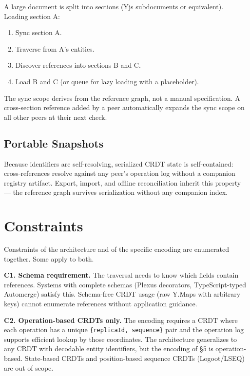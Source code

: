 A large document is split into sections (Yjs subdocuments or equivalent). Loading section A:

\begin{enumerate}
    \item Sync section A.
    \item Traverse from A's entities.
    \item Discover references into sections B and C.
    \item Load B and C (or queue for lazy loading with a placeholder).
\end{enumerate}

The sync scope derives from the reference graph, not a manual specification. A cross-section reference added by a peer automatically expands the sync scope on all other peers at their next check.

\subsection{Portable Snapshots}

Because identifiers are self-resolving, serialized CRDT state is self-contained: cross-references resolve against any peer's operation log without a companion registry artifact. Export, import, and offline reconciliation inherit this property --- the reference graph survives serialization without any companion index.

\section{Constraints}

Constraints of the architecture and of the specific encoding are enumerated together. Some apply to both.

\textbf{C1. Schema requirement.} The traversal needs to know which fields contain references. Systems with complete schemas (Plexus decorators, TypeScript-typed Automerge) satisfy this. Schema-free CRDT usage (raw Y.Maps with arbitrary keys) cannot enumerate references without application guidance.

\textbf{C2. Operation-based CRDTs only.} The encoding requires a CRDT where each operation has a unique \texttt{\{replicaId, sequence\}} pair and the operation log supports efficient lookup by those coordinates. The architecture generalizes to any CRDT with decodable entity identifiers, but the encoding of \S5 is operation-based. State-based CRDTs and position-based sequence CRDTs (Logoot/LSEQ) are out of scope.

